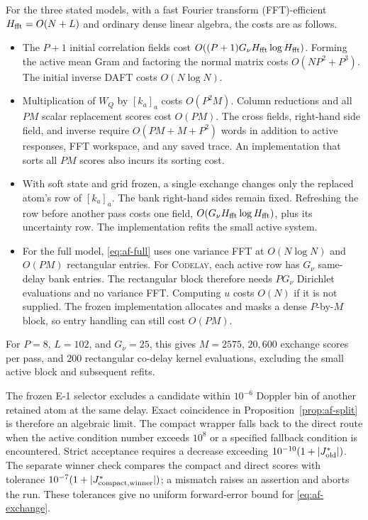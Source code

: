 For the three stated models, with a fast Fourier transform
(FFT)-efficient $H_{\rm fft}=O(N+L)$ and ordinary dense linear
algebra, the costs are as follows.
\begin{itemize}
\item The $P+1$ initial correlation fields cost
$O((P+1)G_\nu H_{\rm fft}\log H_{\rm fft})$.
Forming the active mean Gram and factoring the normal matrix costs
$O(NP^2+P^3)$. The initial inverse DAFT costs $O(N\log N)$.
\item Multiplication of $W_Q$ by $[k_a]_a$ costs $O(P^2M)$.
Column reductions and all $PM$ scalar replacement scores cost
$O(PM)$. The cross fields, right-hand side field, and inverse
require $O(PM+M+P^2)$ words in addition to active responses, FFT
workspace, and any saved trace. An implementation that sorts all
$PM$ scores also incurs its sorting cost.
\item With soft state and grid frozen, a single exchange changes
only the replaced atom's row of $[k_a]_a$. The bank right-hand
sides remain fixed. Refreshing the row before another pass costs
one field, $O(G_\nu H_{\rm fft}\log H_{\rm fft})$, plus its
uncertainty row. The implementation refits the small active system.
\item For the full model, \eqref{eq:af-full} uses one variance FFT
at $O(N\log N)$ and $O(PM)$ rectangular entries. For
\textsc{Codelay}, each active row has $G_\nu$ same-delay bank
entries. The rectangular block therefore needs $PG_\nu$ Dirichlet
evaluations and no variance FFT. Computing $u$ costs $O(N)$ if it
is not supplied. The frozen implementation allocates and masks a
dense $P$-by-$M$ block, so entry handling can still cost $O(PM)$.
\end{itemize}
For $P=8$, $L=102$, and $G_\nu=25$, this gives $M=2575$,
$20{,}600$ exchange scores per pass, and $200$ rectangular co-delay
kernel evaluations, excluding the small active block and subsequent
refits.

\begin{afdmremark}
The frozen E-1 selector excludes a candidate within $10^{-6}$ Doppler
bin of another retained atom at the same delay. Exact coincidence
in Proposition~\ref{prop:af-split} is therefore an algebraic limit.
The compact wrapper falls back to the direct route when the active
condition number exceeds $10^8$ or a specified fallback condition
is encountered. Strict acceptance requires a decrease exceeding
$10^{-10}(1+|J_{\rm old}^*|)$. The separate winner check compares
the compact and direct scores with tolerance
$10^{-7}(1+|J_{\rm compact,winner}^*|)$; a mismatch raises an
assertion and aborts the run. These tolerances give no uniform
forward-error bound for \eqref{eq:af-exchange}.
\end{afdmremark}

